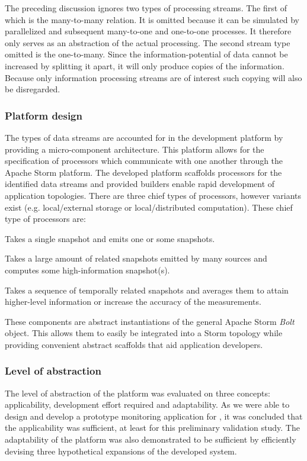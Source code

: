 The preceding discussion ignores two types of processing streams. The first of which is the many-to-many relation. It is omitted because it can be simulated by parallelized and subsequent many-to-one and one-to-one processes. It therefore only serves as an abstraction of the actual processing. The second stream type omitted is the one-to-many. Since the information-potential of data cannot be increased by splitting it apart, it will only produce copies of the information. Because only information processing streams are of interest such copying will also be disregarded. 

\subsubsection{Platform design}
The types of data streams are accounted for in the development platform by providing a micro-component architecture. This platform allows for the specification of processors which communicate with one another through the Apache Storm platform. The developed platform scaffolds processors for the identified data streams and provided builders enable rapid development of application topologies. There are three chief types of processors, however variants exist (e.g. local/external storage or local/distributed computation). These chief type of processors are:
\begin{description}[style=nextline]
\nospace
\item[SingleMessageProcessor]Takes a single snapshot and emits one or some snapshots.
\item[AccumulatorProcessor]Takes a large amount of related snapshots emitted by many sources and computes some high-information snapshot(s).
\item[BufferedProcessor]Takes a sequence of temporally related snapshots and averages them to attain higher-level information or increase the accuracy of the measurements.
\end{description}
These components are abstract instantiations of the general Apache Storm \emph{Bolt} object. This allows them to easily be integrated into a Storm topology while providing convenient abstract scaffolds that aid application developers.

\subsubsection{Level of abstraction}
The level of abstraction of the platform was evaluated on three concepts: applicability, development effort required and adaptability. As we were able to design and develop a prototype monitoring application for \idsystems, it was concluded that the applicability was sufficient, at least for this preliminary validation study. The adaptability of the platform was also demonstrated to be sufficient by efficiently devising three hypothetical expansions of the developed system. 

